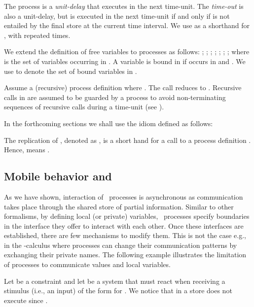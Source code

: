 \documentclass{tlp}
\begin{document}
The process   is a \emph{unit-delay} that executes 
in the next time-unit.  The \emph{time-out}  is
also a unit-delay, but    is executed in the next time-unit if
and only if   is not entailed by the final store at the
current time interval. We use  as a shorthand
for
 , 
with   repeated  times.  


We extend the definition of free variables to processes as follows:   ; ; ; ; ; ; ;   where  is the set of variables occurring in . 
A variable  is bound in  if  occurs in  and . We use  to denote the set of bound variables in . 


Assume a (recursive) process definition 
 where  . The call  reduces to .
Recursive calls in  are assumed to be guarded by a 
 process to avoid non-terminating sequences of recursive
calls during a time-unit  (see \cite{tcc-lics94,NPV02}). 







In the forthcoming sections  we shall use the idiom  defined as follows:
\begin{notation}[Replication]\label{rem:bang}
The replication of , denoted as 
,  is a short hand for a call to a process definition  . 
Hence,  means    . 
\end{notation}







\subsection{Mobile behavior and \utcc}\label{sec:mobility}
As we have shown, interaction of \tccp\ processes is asynchronous as
communication takes place through the shared store of partial
information. Similar to other formalisms, by defining local (or
private) variables, \tccp\ processes specify boundaries in the
interface they offer to interact with each other. Once these
interfaces are established, there are few mechanisms to modify them.
This is not the case e.g., in the -calculus \cite{milner.parrow.ea:calculus-mobile} where
processes can change their communication patterns by exchanging their
private names.  The following example illustrates the limitation of   processes to communicate values and local variables.

\begin{example}
Let   be a constraint and let  
be 
 a system that must react when receiving a stimulus (i.e., an input) of the form
 for .   We notice that    in a store  
does not execute  since   . 
\end{example}
\end{document}
